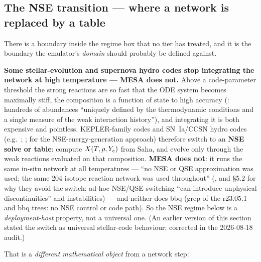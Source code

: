 \subsection{The NSE transition --- where a network is replaced by a table}
\label{sec:nsetransition}

There is a boundary inside the regime box that no tier has treated, and it is
the boundary the emulator's \emph{domain} should probably be defined against.

\textbf{Some stellar-evolution and supernova hydro codes stop integrating the
network at high temperature --- MESA does not.} Above a code-parameter
threshold  the strong reactions are so fast that the ODE system
becomes maximally stiff, the composition is a function of state to high
accuracy (\citealt{hix1999b}: hundreds of abundances ``uniquely defined by the
thermodynamic conditions and a single measure of the weak interaction
history''), and integrating it is both expensive and pointless. KEPLER-family
codes \citep{weaver1978} and SN~Ia/CCSN hydro codes (e.g.\ \citealt{calder2007};
\citealt{seitenzahl2009}; \citealt{timmes2000} for the NSE-energy-generation
approach) therefore switch to an \textbf{NSE solve or table}: compute
$X(T, \rho, Y_{e})$ from Saha, and evolve only \Ye{} through the weak reactions
evaluated on that composition. \textbf{MESA does not}: it runs the same in-situ
network at all temperatures --- ``no NSE or QSE approximation was used; the
same 204 isotope reaction network was used throughout''
(\citealt[\S 6.1]{paxton2015}, and \S 5.2 for why they avoid the switch: ad-hoc
NSE/QSE switching ``can introduce unphysical discontinuities'' and
instabilities) --- and neither does bbq (grep of the r23.05.1 and bbq trees: no
NSE control or code path). So the NSE regime below is a \emph{deployment-host}
property, not a universal one. (An earlier version of this section stated the
switch as universal stellar-code behaviour; corrected in the 2026-08-18 audit.)

That is a \emph{different mathematical object} from a network step:

